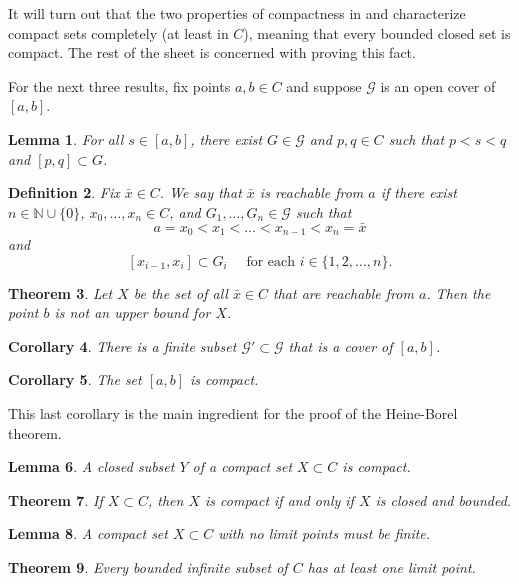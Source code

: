 \documentclass{amsart}
\newtheorem{theorem}{Theorem}
\newtheorem{lemma}[theorem]{Lemma}
\newtheorem{definition}[theorem]{Definition}
\newtheorem{corollary}[theorem]{Corollary}
\newcommand{\N}{\mathbb N}
\newcommand{\1}{\mathds{1}}
\def \N {{\mathbb {N}}}
\numberwithin{equation}{section}
\numberwithin{theorem}{section}
\begin{document}
It will turn out that the two properties of compactness in  and  characterize compact sets completely (at least in $C$), meaning that every bounded closed set is compact.  The rest of the sheet is concerned with proving this fact.


\newcommand\cG{\mathcal G}

For the next three results, fix points $a,b\in C$ and suppose $\cG$ is an open cover of $[a,b]$.

\begin{lemma}
\label{lem2}
For all $s\in[a,b]$, there exist $G\in\cG$ and $p,q\in C$ such that $p<s<q$ and $[p,q]\subset G$.
\end{lemma}



\begin{definition}
	Fix $\bar x \in C$.  We say that $\bar x$ is \emph{reachable from $a$} if there exist $n\in\N\cup\{0\}$, $x_0,\ldots,x_n\in C$, and $G_1,\ldots,G_n\in\cG$ such that 
	\[
		a=x_0<x_1<\ldots<x_{n-1}<x_n=\bar x
	\]
	and
	\[
		[x_{i-1},x_i]\subset G_i
			\quad\text{ for each } i \in \{1,2,\dots, n\}.
	\]
\end{definition}



\begin{theorem}
Let $X$ be the set of all $\bar x\in C$ that are \emph{reachable from $a$}.  Then the point $b$ is not an upper bound for $X$.
%
\end{theorem}

\begin{corollary}
There is a finite subset $\cG'\subset\cG$ that is a cover of $[a,b]$.
\end{corollary}

\begin{corollary}
The set $[a, b]$ is compact.
\end{corollary}

This last corollary is the main ingredient for the proof of the Heine-Borel theorem.

\begin{lemma}
A closed subset $Y$ of a compact set $X \subset C$ is compact.
\end{lemma}

\begin{theorem} If $X \subset C$, then  $X$ is compact if and only if $X$ is closed and bounded.
\end{theorem}


\begin{lemma}
A compact set $X \subset C$ with no limit points must be finite.
\end{lemma}

\begin{theorem} Every bounded infinite subset of $C$ has at least one limit point.
\end{theorem}
\end{document}
